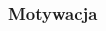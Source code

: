 \documentclass[aspectratio=169]{beamer}  %
\begin{document}
\begin{frame}
	\frametitle{Motywacja}
	\begin{columns}
		\begin{column}{0.4\textwidth}
			\begin{figure}
			\centering
			\end{figure}
			\vspace{50pt}
		\end{column}
				\begin{column}{0.2\textwidth}
			\begin{figure}
				\centering
			\end{figure}
			\vspace{50pt}
		\end{column}
		\begin{column}{0.4\textwidth}
			\begin{figure}
				\centering
			\end{figure}
			\vspace{50pt}
		\end{column}
	\end{columns}
\end{frame}
\end{document}
